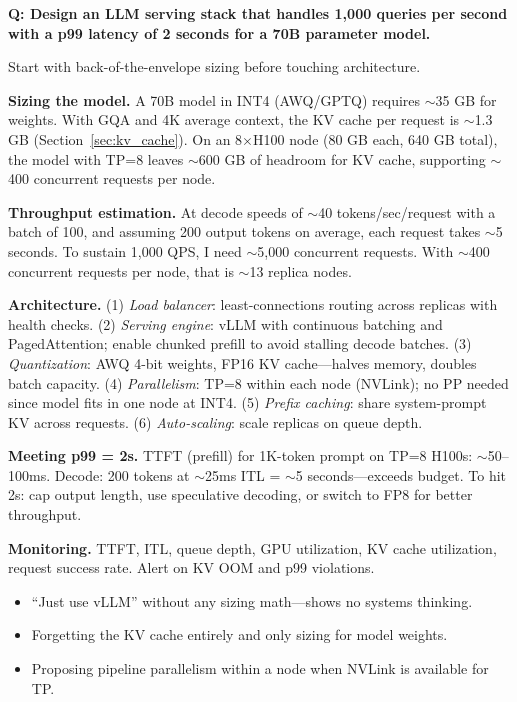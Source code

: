 \begin{interviewq}
\textbf{Q: Design an LLM serving stack that handles 1,000 queries per second with a p99 latency of 2 seconds for a 70B parameter model.}

 \quad {} \quad \badgefreq{\freqhigh}

\stronganswer

Start with back-of-the-envelope sizing before touching architecture.

\textbf{Sizing the model.} A 70B model in INT4 (AWQ/GPTQ) requires $\sim$35 GB for weights. With GQA and 4K average context, the KV cache per request is $\sim$1.3 GB (Section~\ref{sec:kv_cache}). On an 8$\times$H100 node (80 GB each, 640 GB total), the model with TP=8 leaves $\sim$600 GB of headroom for KV cache, supporting $\sim$400 concurrent requests per node.

\textbf{Throughput estimation.} At decode speeds of $\sim$40 tokens/sec/request with a batch of 100, and assuming 200 output tokens on average, each request takes $\sim$5 seconds. To sustain 1,000 QPS, I need $\sim$5,000 concurrent requests. With $\sim$400 concurrent requests per node, that is $\sim$13 replica nodes.

\textbf{Architecture.} (1) \textit{Load balancer}: least-connections routing across replicas with health checks. (2) \textit{Serving engine}: vLLM with continuous batching and PagedAttention; enable chunked prefill to avoid stalling decode batches. (3) \textit{Quantization}: AWQ 4-bit weights, FP16 KV cache---halves memory, doubles batch capacity. (4) \textit{Parallelism}: TP=8 within each node (NVLink); no PP needed since model fits in one node at INT4. (5) \textit{Prefix caching}: share system-prompt KV across requests. (6) \textit{Auto-scaling}: scale replicas on queue depth.

\textbf{Meeting p99 = 2s.} TTFT (prefill) for 1K-token prompt on TP=8 H100s: $\sim$50--100ms. Decode: 200 tokens at $\sim$25ms ITL = $\sim$5 seconds---exceeds budget. To hit 2s: cap output length, use speculative decoding, or switch to FP8 for better throughput.

\textbf{Monitoring.} TTFT, ITL, queue depth, GPU utilization, KV cache utilization, request success rate. Alert on KV OOM and p99 violations.

\redflags
\begin{itemize}
    \item ``Just use vLLM'' without any sizing math---shows no systems thinking.
    \item Forgetting the KV cache entirely and only sizing for model weights.
    \item Proposing pipeline parallelism within a node when NVLink is available for TP.
\end{itemize}


\end{interviewq}
